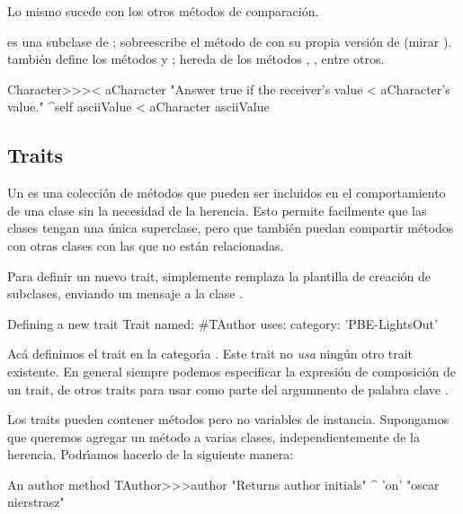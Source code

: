\documentclass[a4paper,10pt,twoside]{book}
\begin{document}
Lo mismo sucede con los otros m\'etodos de comparaci\'on.

 es una subclase de ; sobreescribe el m\'etodo  de \ct{<} con su propia versi\'on de \ct{<} (mirar ).   tambi\'en define los m\'etodos \ct{=} y ; hereda de  los m\'etodos \ct{>=}, \ct{<=}, \ct{~=} entre otros.
%
%
\begin{method}[CharacterLessThan]{}
Character>>>< aCharacter 
	"Answer true if the receiver's value < aCharacter's value."
	^self asciiValue < aCharacter asciiValue
\end{method}

\subsection{Traits}
Un  es una colecci\'on de m\'etodos que pueden ser incluidos en el comportamiento de una clase sin la necesidad de la herencia. Esto permite facilmente que las clases tengan una \'unica superclase, pero que tambi\'en puedan compartir m\'etodos con otras clases con las que no est\'an relacionadas.

Para definir un nuevo trait, simplemente remplaza la plantilla de creaci\'on de subclases, enviando un mensaje a la clase .

\begin{classdef}[tauthor]{Defining a new trait}
Trait named: #TAuthor
	uses: { }
	category: 'PBE-LightsOut'
\end{classdef}

\noindent
Ac\'a definimos el trait  en la categor\'\i{}a .
Este trait no \emph{usa} ning\'un otro trait existente.
En general siempre podemos especificar la expresi\'on de composici\'on de un trait, de otros traits para usar como parte del argumnento de palabra clave .


Los traits pueden contener m\'etodos pero no variables de instancia.
Supongamos que queremos agregar un m\'etodo  a varias clases, independientemente de la herencia. 
Podr\'\i{}amos hacerlo de la siguiente manera:


\begin{method}[author]{An author method}
TAuthor>>>author
    "Returns author initials"
	^ 'on'    "oscar nierstrasz"
\end{method}
\end{document}
